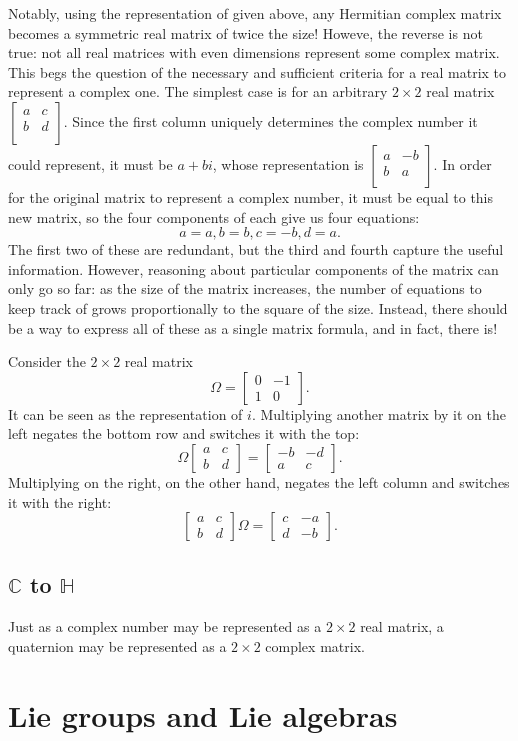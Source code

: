 \documentclass{article}
\begin{document}
Notably, using the representation of given above,
any Hermitian complex matrix becomes a symmetric real matrix of twice the size!
Howeve, the reverse is not true:
not all real matrices with even dimensions represent some complex matrix.
This begs the question of the necessary and sufficient criteria
for a real matrix to represent a complex one.
The simplest case is for an arbitrary $2 \times 2$ real matrix
$\begin{bmatrix}
  a & c \\
  b & d \\
\end{bmatrix}$.
Since the first column uniquely determines the complex number it could represent,
it must be $a+bi$, whose representation is
$\begin{bmatrix}
  a & -b \\
  b & a \\
\end{bmatrix}$.
In order for the original matrix to represent a complex number,
it must be equal to this new matrix,
so the four components of each give us four equations:
\[a = a, b = b, c = -b, d = a.\]
The first two of these are redundant,
but the third and fourth capture the useful information.
However, reasoning about particular components of the matrix can only go so far:
as the size of the matrix increases, the number of equations to keep track of grows
proportionally to the square of the size.
Instead, there should be a way to express all of these as a single matrix formula,
and in fact, there is!

Consider the $2 \times 2$ real matrix
\[
\Omega = \begin{bmatrix}
  0 & -1 \\
  1 & 0
\end{bmatrix}.
\]
It can be seen as the representation of $i$.
Multiplying another matrix by it on the left
negates the bottom row and switches it with the top:
\[
\Omega
\begin{bmatrix}
  a & c \\
  b & d
\end{bmatrix}
=
\begin{bmatrix}
  -b & -d \\
  a & c
\end{bmatrix}
.
\]
Multiplying on the right, on the other hand,
negates the left column and switches it with the right:
\[
\begin{bmatrix}
  a & c \\
  b & d
\end{bmatrix}
\Omega
=
\begin{bmatrix}
  c & -a \\
  d & -b
\end{bmatrix}
.
\]

\subsection{\texorpdfstring{$\mathbb{C}$}{C} to \texorpdfstring{$\mathbb{H}$}{H}}

Just as a complex number may be represented as a $2 \times 2$ real matrix,
a quaternion may be represented as a $2 \times 2$ complex matrix.

\section{Lie groups and Lie algebras}
\end{document}
